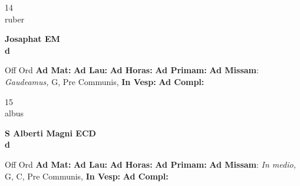 \documentclass[10pt, openany]{book}
\begin{document}
    \begin{center}
        \begin{minipage}{3.5in}
            \vspace{2em}
            \begin{minipage}{0.5in}
                {\Huge 14} \\
                {\normalsize ruber}
            \end{minipage}
            \begin{minipage}{3.0in}
                \textbf{ \large Josaphat EM \\
                \textnormal{\normalsize d}}

            \end{minipage}
            \begin{justify}Off Ord
                \textbf{Ad Mat: }
                \textbf{Ad Lau: }
                \textbf{Ad Horas: }
                \textbf{Ad Primam: }\textbf{Ad Missam}: \textit{Gaudeamus,} G, Pre Communis, 
                \textbf{In Vesp: }
                \textbf{Ad Compl: }
            \end{justify}
        \end{minipage}
    \end{center}

    \begin{center}
        \begin{minipage}{3.5in}
            \vspace{2em}
            \begin{minipage}{0.5in}
                {\Huge 15} \\
                {\normalsize albus}
            \end{minipage}
            \begin{minipage}{3.0in}
                \textbf{ \large S Alberti Magni ECD \\
                \textnormal{\normalsize d}}

            \end{minipage}
            \begin{justify}Off Ord
                \textbf{Ad Mat: }
                \textbf{Ad Lau: }
                \textbf{Ad Horas: }
                \textbf{Ad Primam: }\textbf{Ad Missam}: \textit{In medio,} G, C, Pre Communis, 
                \textbf{In Vesp: }
                \textbf{Ad Compl: }
            \end{justify}
        \end{minipage}
    \end{center}
\end{document}
